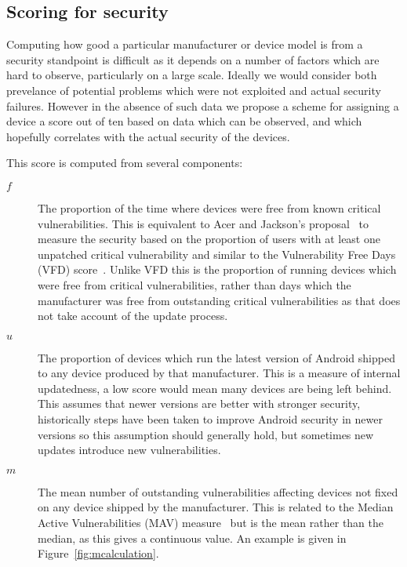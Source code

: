 \subsection{Scoring for security}
\label{sec:security_scoring}

Computing how good a particular manufacturer or device model is from a security standpoint is difficult as it depends on a number of factors which are hard to observe, particularly on a large scale.
Ideally we would consider both prevelance of potential problems which were not exploited and actual security failures.
However in the absence of such data we propose a scheme for assigning a device a score out of ten based on data which can be observed, and which hopefully correlates with the actual security of the devices.

This score is computed from several components:
\begin{description}
  \item[$f$] The proportion of the time where devices were free from known critical vulnerabilities. This is equivalent to Acer and Jackson's proposal~\cite{Acer2010} to measure the security based on the proportion of users with at least one unpatched critical vulnerability and similar to the Vulnerability Free Days (VFD) score~\cite{Wright2014}.
  Unlike VFD this is the proportion of running devices which were free from critical vulnerabilities, rather than days which the manufacturer was free from outstanding critical vulnerabilities as that does not take account of the update process.
  \item[$u$] The proportion of devices which run the latest version of Android shipped to any device produced by that manufacturer. This is a measure of internal updatedness, a low score would mean many devices are being left behind.
  This assumes that newer versions are better with stronger security, historically steps have been taken to improve Android security in newer versions so this assumption should generally hold, but sometimes new updates introduce new vulnerabilities.
  \item[$m$] The mean number of outstanding vulnerabilities affecting devices not fixed on any device shipped by the manufacturer. This is related to the Median Active Vulnerabilities (MAV) measure~\cite{Wright2014} but is the mean rather than the median, as this gives a continuous value.
  An example is given in Figure~\ref{fig:mcalculation}.
\end{description}

